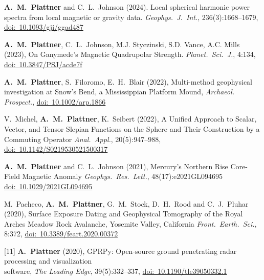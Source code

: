 \documentclass[10pt]{article}
\begin{document}
\spcp
\shift[17] \textbf{A.~M.~Plattner} and C.\ L.~Johnson (2024). Local spherical harmonic power spectra from local magnetic or gravity data. \emph{Geophys.~J.~Int.}, 236(3):1668--1679,  \href{https://doi.org/10.1093/gji/ggad487}{doi:~10.1093/gji/ggad487} 

\spcp
\shift[16] \textbf{A.~M.~Plattner}, C.\ L.~Johnson, M.J. Styczinski, S.D. Vance, A.C. Mills (2023), On Ganymede's Magnetic Quadrupolar Strength. \emph{Planet.\ Sci.\ J.}, 4:134, \href{https://doi.org/10.3847/PSJ/acde7f}{doi:~10.3847/PSJ/acde7f} 


\spcp
\shift[15] \textbf{A.~M.~Plattner}, S.~Filoromo, E.~H.~Blair (2022), Multi-method geophysical
investigation at Snow's Bend, a Mississippian Platform Mound,
\emph{Archaeol. Prospect.}, \href{https://doi.org/10.1002/arp.1866}{doi:~10.1002/arp.1866}

\spcp
\shift[14] V.~Michel, \textbf{A.~M.~Plattner}, K.~Seibert (2022),
A Unified Approach to Scalar, Vector, and Tensor Slepian Functions on the Sphere and Their Construction by a Commuting Operator
\emph{Anal.~Appl.}, 20(5):947--988, \href{https://doi.org/10.1142/S0219530521500317}{doi:~10.1142/S0219530521500317}

\spcp
\shift[13] \textbf{A.~M.~Plattner} and C.\ L.~Johnson (2021),
Mercury's Northern Rise Core-Field Magnetic Anomaly
\emph{Geophys.~Res.~Lett.}, 48(17):e2021GL094695 \href{https://doi.org/10.1029/2021GL094695}{doi:~10.1029/2021GL094695}

\spcp
\grshift \gr[12] M.~Pacheco, \textbf{A.~M.~Plattner}, G.~M.~Stock, D.~H.~Rood and C.~J.~Pluhar (2020),
Surface Exposure Dating and Geophysical Tomography of the Royal Arches Meadow Rock Avalanche, Yosemite Valley, California
\emph{Front.~Earth.~Sci.}, 8:372, \href{https://www.frontiersin.org/articles/10.3389/feart.2020.00372/full}{doi:~10.3389/feart.2020.00372} 

\spcp
\hspace{-0.675cm}[11] \textbf{A.~Plattner} (2020), GPRPy: Open-source ground penetrating radar processing and visualization \\software, \emph{The Leading Edge}, 39(5):332--337, \href{https://doi.org/10.1190/tle39050332.1}{doi:~10.1190/tle39050332.1}
\end{document}
